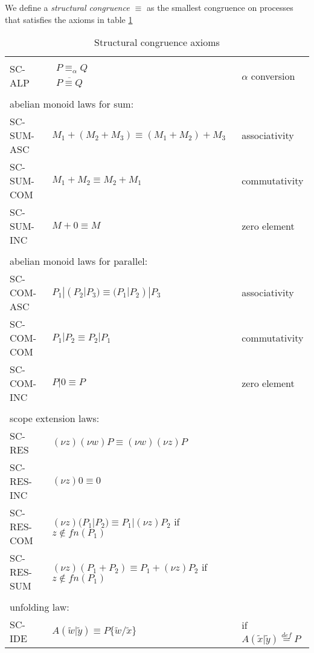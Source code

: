 \begin{definition}
  We define a \emph{structural congruence $\equiv$} as the smallest congruence on processes that satisfies the axioms in table \ref{structuralcongrunce}
  \begin{table}
    \begin{tabular}{lll}
      \hline\\
	SC-ALP&$\begin{array}{c}P \equiv_{\alpha} Q\\\overline{P\equiv Q}\end{array}$&$\alpha$ conversion
      \\\\
	\multicolumn{3}{l}{abelian monoid laws for sum:}
      \\
	SC-SUM-ASC& $M_{1}+(M_{2}+M_{3})\equiv (M_{1}+M_{2})+M_{3}$ &associativity
      \\
	SC-SUM-COM& $M_{1}+M_{2}\equiv M_{2}+M_{1}$ &commutativity
      \\
	SC-SUM-INC& $M+0\equiv M$&zero element
      \\\\
	\multicolumn{3}{l}{abelian monoid laws for parallel:}
      \\
	SC-COM-ASC& $P_{1}|(P_{2}|P_{3})\equiv (P_{1}|P_{2})|P_{3}$ &associativity
      \\
	SC-COM-COM& $P_{1}|P_{2}\equiv P_{2}|P_{1}$ &commutativity
      \\
	SC-COM-INC& $P|0\equiv P$&zero element
      \\\\
	\multicolumn{3}{l}{scope extension laws:}
      \\
	SC-RES& $(\nu z) (\nu w) P \equiv (\nu w) (\nu z) P$ &
      \\
	SC-RES-INC& $(\nu z) 0 \equiv 0$ &
      \\
	SC-RES-COM& $(\nu z) (P_{1}|P_{2}) \equiv P_{1}|(\nu z) P_{2}$ if $z\notin fn(P_{1})$&
      \\
	SC-RES-SUM& $(\nu z) (P_{1}+P_{2}) \equiv P_{1}+(\nu z) P_{2}$ if $z\notin fn(P_{1})$&
      \\\\
	\multicolumn{3}{l}{unfolding law:}
      \\
	SC-IDE&$A(\tilde{w}|\tilde{y})\equiv P\{\tilde{w}/\tilde{x}\}$&if $A(\tilde{x}|\tilde{y})\stackrel{def}{=}P$
      \\\hline
    \end{tabular}
    \caption{Structural congruence axioms}
    \label{structuralcongrunce}
  \end{table}
\end{definition}

